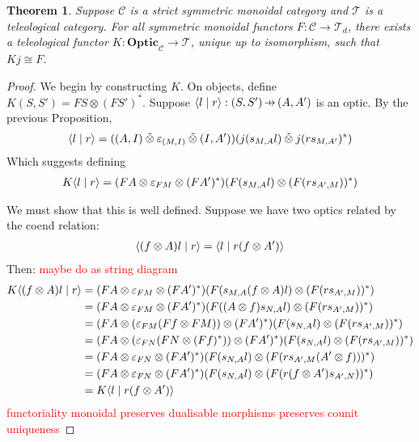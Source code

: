 \documentclass[11pt,a4paper]{article}
\theoremstyle{plain}
\newtheorem{theorem}{Theorem}[subsection]
\theoremstyle{definition}
\newcommand{\C}{\mathscr{C}}
\newcommand{\T}{\mathscr{T}}
\newcommand{\Optic}{\mathbf{Optic}}
\newcommand{\switched}{\mathbin{\tilde{\otimes}}}
\newcommand{\rep}[2]{{\ensuremath \left\langle #1 \mid #2 \right\rangle}}
\newcommand{\hto}{\ensuremath{\,\mathaccent\shortmid\rightarrow\,}}
\newcommand{\todo}[1]{\textcolor{red}{\small #1}}
\begin{document}
\begin{theorem}
  \label{optic-is-free-teleological-cat}
  Suppose $\C$ is a strict symmetric monoidal category and $\T$ is a teleological category. For all symmetric monoidal functors $F : \C \to \T_d$, there exists a teleological functor $K : \Optic_\C \to \T$, unique up to isomorphism, such that $Kj \cong F$.
\end{theorem}
\begin{proof}
  We begin by constructing $K$. On objects, define $K(S, S') = FS \otimes (FS')^*$. Suppose $\rep{l}{r} : (S, S') \hto (A, A')$ is an optic. By the previous Proposition,
  \begin{align*}
    \rep{l}{r} = ((A, I) \switched \varepsilon_{(M, I)} \switched (I, A'))(j(s_{M,A}l) \switched j(rs_{M,A'})^*)
  \end{align*}
  Which suggests defining
  \begin{align*}
    K\rep{l}{r} = (FA \otimes \varepsilon_{FM} \otimes (FA')^*)(F(s_{M,A}l) \otimes (F(rs_{A', M}))^* )
  \end{align*}
  
  We must show that this is well defined. Suppose we have two optics related by the coend relation:
  \begin{align*}
    \rep{(f \otimes A) l}{r} = \rep{l}{r (f \otimes A')}
  \end{align*}
  Then: \todo{maybe do as string diagram}
  \begin{align*}
    K\rep{(f \otimes A) l}{r}
    &= (FA \otimes \varepsilon_{FM} \otimes (FA')^*)(F(s_{M,A}(f \otimes A)l) \otimes (F(rs_{A',M}))^* ) \\
    &= (FA \otimes \varepsilon_{FM} \otimes (FA')^*)(F((A \otimes f)s_{N,A}l) \otimes (F(rs_{A',M}))^* ) \\
    &= (FA \otimes (\varepsilon_{FM} (Ff \otimes FM)) \otimes (FA')^*)(F(s_{N,A}l) \otimes (F(rs_{A',M}))^* ) \\
    &= (FA \otimes (\varepsilon_{FN} (FN \otimes (Ff)^*)) \otimes (FA')^*)(F(s_{N,A}l) \otimes (F(rs_{A',M}))^* ) \\
    &= (FA \otimes \varepsilon_{FN} \otimes (FA')^*)(F(s_{N,A}l) \otimes (F(rs_{A',M}(A' \otimes f)))^* ) \\
    &= (FA \otimes \varepsilon_{FN} \otimes (FA')^*)(F(s_{N,A}l) \otimes (F(r(f \otimes A')s_{A',N}))^* ) \\
    &= K\rep{ l}{r (f \otimes A')}
  \end{align*}
  \todo{functoriality} \todo{monoidal} \todo{preserves dualisable morphisms} \todo{preserves counit}
  \todo{uniqueness} 
\end{proof}
\end{document}
